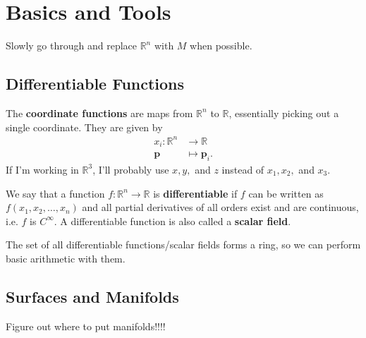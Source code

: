 \documentclass[10pt]{report}
\begin{document}
\tableofcontents


\chapter{Basics and Tools}

{\color{red}Slowly go through and replace $\mathbb{R}^n$ with $M$ when possible.}



\section{Differentiable Functions}

The \textbf{coordinate functions} are maps from $\mathbb{R}^n$ to $\mathbb{R}$, essentially picking out a single coordinate. They are given by
\begin{align*}
	x_i : \mathbb{R}^n &\to \mathbb{R} \\
	\mathbf{p}&\mapsto \mathbf{p}_i.
\end{align*}
If I'm working in $\mathbb{R}^3$, I'll probably use $x,y,$ and $z$ instead of $x_1, x_2,$ and $x_3$.

We say that a function $f:\mathbb{R}^n \to \mathbb{R}$ is \textbf{differentiable} if $f$ can be written as $f(x_1, x_2, \dots, x_n)$ and all partial derivatives of all orders exist and are continuous, i.e. $f$ is $C^{\infty}$. A differentiable function is also called a \textbf{scalar field}.

The set of all differentiable functions/scalar fields forms a ring, so we can perform basic arithmetic with them.


\section{Surfaces and Manifolds}

{\color{red}Figure out where to put manifolds!!!!}
\end{document}
